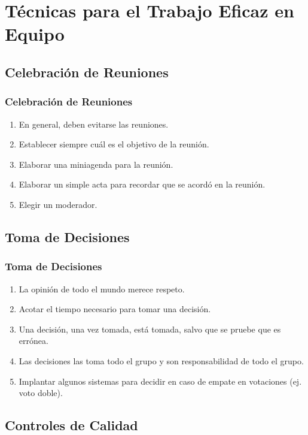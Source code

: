 \documentclass[a4paper,t,xcolor=pst,dvips]{beamer}
\begin{document}
\section{Técnicas para el Trabajo Eficaz en Equipo}

\subsection{Celebración de Reuniones}

\begin{frame}[c]
	\frametitle{Celebración de Reuniones}
	\begin{enumerate}[<+->]
		\item En general, deben evitarse las reuniones.
		\item Establecer siempre cuál es el objetivo de la reunión.
		\item Elaborar una miniagenda para la reunión.
		\item Elaborar un simple acta para recordar que se acordó en la reunión.
		\item Elegir un moderador.
	\end{enumerate}
\end{frame}

\subsection{Toma de Decisiones}

\begin{frame}[c]
	\frametitle{Toma de Decisiones}
	\begin{enumerate}[<+->]
		\item La opinión de todo el mundo merece respeto.
		\item Acotar el tiempo necesario para tomar una decisión.
		\item Una decisión, una vez tomada, está tomada, salvo que se pruebe que es errónea.
		\item Las decisiones las toma todo el grupo y son responsabilidad de todo el grupo.
		\item Implantar algunos sistemas para decidir en caso de empate en votaciones (ej. voto doble).
	\end{enumerate}
\end{frame}

\subsection{Controles de Calidad}
\end{document}

